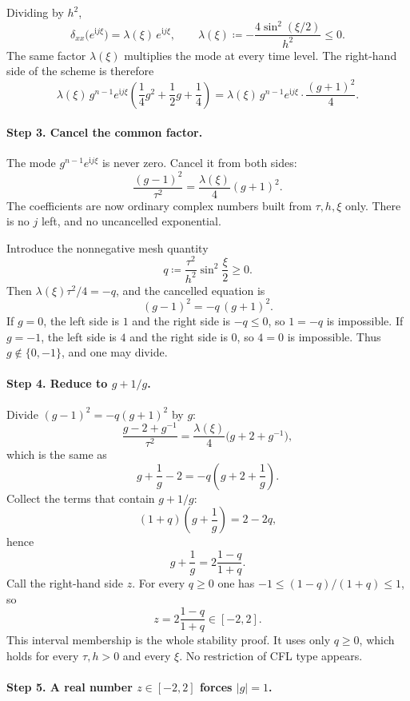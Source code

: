 Dividing by \(h^2\),
\[
\delta_{xx}\bigl(e^{\mathrm i j\xi}\bigr)
=
\lambda(\xi)\,e^{\mathrm i j\xi},
\qquad
\lambda(\xi)
\coloneqq
-\frac{4\sin^2(\xi/2)}{h^2}
\le 0.
\]
The same factor \(\lambda(\xi)\) multiplies the mode at every time level. The right-hand side of the scheme is therefore
\[
\lambda(\xi)\,g^{n-1}e^{\mathrm i j\xi}
\left(
\frac14 g^2+\frac12 g+\frac14
\right)
=
\lambda(\xi)\,g^{n-1}e^{\mathrm i j\xi}\cdot\frac{(g+1)^2}{4}.
\]

\paragraph{Step 3. Cancel the common factor.}

The mode \(g^{n-1}e^{\mathrm i j\xi}\) is never zero. Cancel it from both sides:
\[
\frac{(g-1)^2}{\tau^2}
=
\frac{\lambda(\xi)}{4}(g+1)^2.
\]
The coefficients are now ordinary complex numbers built from \(\tau,h,\xi\) only. There is no \(j\) left, and no uncancelled exponential.

Introduce the nonnegative mesh quantity
\[
q
\coloneqq
\frac{\tau^2}{h^2}\sin^2\frac{\xi}{2}
\ge 0.
\]
Then \(\lambda(\xi)\tau^2/4=-q\), and the cancelled equation is
\[
(g-1)^2
=
-q\,(g+1)^2.
\]
If \(g=0\), the left side is \(1\) and the right side is \(-q\le 0\), so \(1=-q\) is impossible. If \(g=-1\), the left side is \(4\) and the right side is \(0\), so \(4=0\) is impossible. Thus \(g\notin\{0,-1\}\), and one may divide.

\paragraph{Step 4. Reduce to \(g+1/g\).}

Divide \((g-1)^2=-q(g+1)^2\) by \(g\):
\[
\frac{g-2+g^{-1}}{\tau^2}
=
\frac{\lambda(\xi)}{4}\bigl(g+2+g^{-1}\bigr),
\]
which is the same as
\[
g+\frac{1}{g}-2
=
-q\left(g+2+\frac{1}{g}\right).
\]
Collect the terms that contain \(g+1/g\):
\[
\left(1+q\right)\left(g+\frac{1}{g}\right)
=
2-2q,
\]
hence
\[
g+\frac{1}{g}
=
2\frac{1-q}{1+q}.
\]
Call the right-hand side \(z\). For every \(q\ge 0\) one has \(-1\le(1-q)/(1+q)\le 1\), so
\[
z
=
2\frac{1-q}{1+q}
\in[-2,2].
\]
This interval membership is the whole stability proof. It uses only \(q\ge 0\), which holds for every \(\tau,h>0\) and every \(\xi\). No restriction of CFL type appears.

\paragraph{Step 5. A real number \(z\in[-2,2]\) forces \(|g|=1\).}

